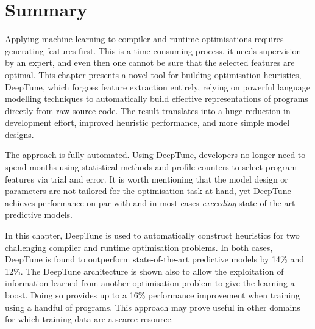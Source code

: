 \section{Summary}
\label{sec:deeptune-conclusion}

Applying machine learning to compiler and runtime optimisations requires generating features first. This is a time consuming process, it needs supervision by an expert, and even then one cannot be sure that the selected features are optimal. This chapter presents a novel tool for building optimisation heuristics, DeepTune, which forgoes feature extraction entirely, relying on powerful language modelling techniques to automatically build effective representations of programs directly from raw source code. The result translates into a huge reduction in development effort, improved heuristic performance, and more simple model designs.

The approach is fully automated. Using DeepTune, developers no longer need to spend months using statistical methods and profile counters to select program features via trial and error. It is worth mentioning that the model design or parameters are not tailored for the optimisation task at hand, yet DeepTune achieves performance on par with and in most cases \emph{exceeding} state-of-the-art predictive models.

In this chapter, DeepTune is used to automatically construct heuristics for two challenging compiler and runtime optimisation problems. In both cases, DeepTune is found to outperform state-of-the-art predictive models by 14\% and 12\%. The DeepTune architecture is shown also to allow the exploitation of information learned from another optimisation problem to give the learning a boost. Doing so provides up to a 16\% performance improvement when training using a handful of programs. This approach may prove useful in other domains for which training data are a scarce resource.
